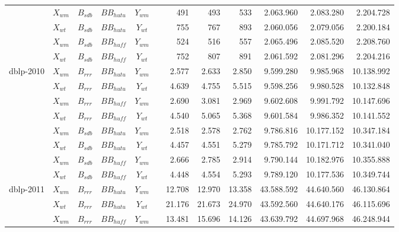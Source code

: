 \begin{table}
\begin{tabular}{l||l|l|l|l|c||r|r|r||r|r|r}
		& $X_{wm}$ & $B_{sdb}$ & $BB_{hutu}$ & \multicolumn{1}{c}{$Y_{wm}$} & & 491 & 493 & 533 & 2.063.960 & 2.083.280 & 2.204.728 \\ 
		& $X_{wt}$ & $B_{sdb}$ & $BB_{hutu}$ & \multicolumn{1}{c}{$Y_{wt}$} & & 755 & 767 & 893 & 2.060.056 & 2.079.056 & 2.200.184 \\ 
		& $X_{wm}$ & $B_{sdb}$ & $BB_{huff}$ & \multicolumn{1}{c}{$Y_{wm}$} & & 524 & 516 & 557 & 2.065.496 & 2.085.520 & 2.208.760 \\ 
		& $X_{wt}$ & $B_{sdb}$ & $BB_{huff}$ & \multicolumn{1}{c}{$Y_{wt}$} & & 752 & 807 & 891 & 2.061.592 & 2.081.296 & 2.204.216 \\ 
		\hline
		\multirow{8}{*}{dblp-2010} & $X_{wm}$ & $B_{rrr}$ & $BB_{hutu}$ & \multicolumn{1}{c}{$Y_{wm}$} & & 2.577 & 2.633 & 2.850 & 9.599.280 & 9.985.968 & 10.138.992 \\
		& $X_{wt}$ & $B_{rrr}$ & $BB_{hutu}$ & \multicolumn{1}{c}{$Y_{wt}$} & & 4.639 & 4.755 & 5.515 & 9.598.256 & 9.980.528 & 10.132.848 \\ 
		& $X_{wm}$ & $B_{rrr}$ & $BB_{huff}$ & \multicolumn{1}{c}{$Y_{wm}$} & & 2.690 & 3.081 & 2.969 & 9.602.608 & 9.991.792 & 10.147.696 \\ 
		& $X_{wt}$ & $B_{rrr}$ & $BB_{huff}$ & \multicolumn{1}{c}{$Y_{wt}$} & & 4.540 & 5.065 & 5.368 & 9.601.584 & 9.986.352 & 10.141.552 \\ 
		& $X_{wm}$ & $B_{sdb}$ & $BB_{hutu}$ & \multicolumn{1}{c}{$Y_{wm}$} & & 2.518 & 2.578 & 2.762 & 9.786.816 & 10.177.152 & 10.347.184 \\ 
		& $X_{wt}$ & $B_{sdb}$ & $BB_{hutu}$ & \multicolumn{1}{c}{$Y_{wt}$} & & 4.457 & 4.551 & 5.279 & 9.785.792 & 10.171.712 & 10.341.040 \\ 
		& $X_{wm}$ & $B_{sdb}$ & $BB_{huff}$ & \multicolumn{1}{c}{$Y_{wm}$} & & 2.666 & 2.785 & 2.914 & 9.790.144 & 10.182.976 & 10.355.888 \\ 
		& $X_{wt}$ & $B_{sdb}$ & $BB_{huff}$ & \multicolumn{1}{c}{$Y_{wt}$} & & 4.448 & 4.554 & 5.293 & 9.789.120 & 10.177.536 & 10.349.744 \\ 
		\hline
		\multirow{8}{*}{dblp-2011} & $X_{wm}$ & $B_{rrr}$ & $BB_{hutu}$ & \multicolumn{1}{c}{$Y_{wm}$} & & 12.708 & 12.970 & 13.358 & 43.588.592 & 44.640.560 & 46.130.864 \\
		& $X_{wt}$ & $B_{rrr}$ & $BB_{hutu}$ & \multicolumn{1}{c}{$Y_{wt}$} & & 21.176 & 21.673 & 24.970 & 43.592.560 & 44.640.176 & 46.115.696 \\ 
		& $X_{wm}$ & $B_{rrr}$ & $BB_{huff}$ & \multicolumn{1}{c}{$Y_{wm}$} & & 13.481 & 15.696 & 14.126 & 43.639.792 & 44.697.968 & 46.248.944 \\ 

\end{tabular}
\end{table}
